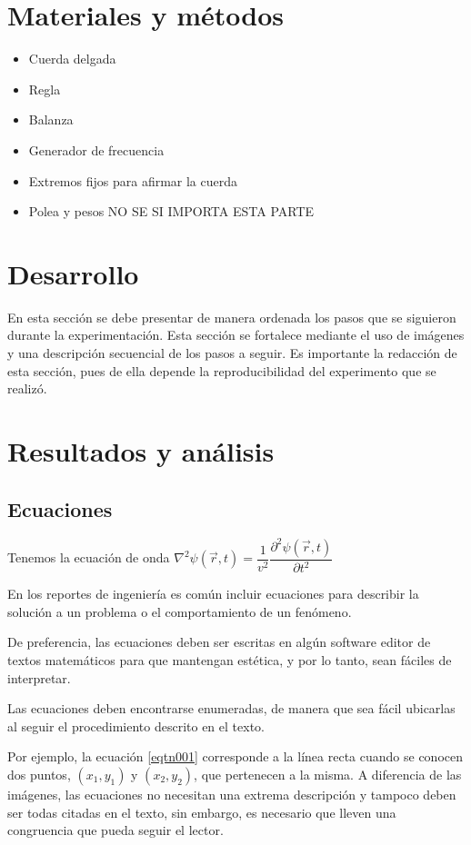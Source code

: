 \documentclass[times,5p, twocolumn]{elsarticle}
\begin{document}
\section{Materiales y métodos}
\begin{itemize}
    \item Cuerda delgada
    \item Regla
    \item Balanza
    \item Generador de frecuencia
    \item Extremos fijos para afirmar la cuerda
    \item Polea y pesos NO SE SI IMPORTA ESTA PARTE
\end{itemize}

\section{Desarrollo}

En esta sección se debe presentar de manera ordenada los pasos que se siguieron durante la experimentación. Esta sección se fortalece mediante el uso de imágenes y una descripción secuencial de los pasos a seguir. Es importante la redacción de esta sección, pues de ella depende la reproducibilidad del experimento que se realizó.

\section{Resultados y análisis}
\subsection{Ecuaciones}
Tenemos la ecuación de onda $\nabla^2\psi(\vec r, t)=\dfrac
1{v^2}\dfrac{\partial^2\psi
(\vec r,t)}{\partial t^2} $ 


En los reportes de ingeniería es común incluir ecuaciones para describir la solución a un problema o el comportamiento de un fenómeno.

De preferencia, las ecuaciones deben ser escritas en algún software editor de textos matemáticos para que mantengan estética, y por lo tanto, sean fáciles de interpretar.

Las ecuaciones deben encontrarse enumeradas, de manera que sea fácil ubicarlas al seguir el procedimiento descrito en el texto.

Por ejemplo, la ecuación \ref{eqtn001} corresponde a la línea recta cuando se conocen dos puntos, $(x_1,y_1)$ y $(x_2,y_2)$, que pertenecen a la misma. A diferencia de las imágenes, las ecuaciones no necesitan una extrema descripción y tampoco deben ser todas citadas en el texto, sin embargo, es necesario que lleven una congruencia que pueda seguir el lector.
\end{document}
